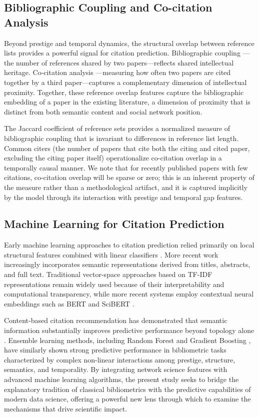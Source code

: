 \documentclass[11pt,a4paper]{article}
\begin{document}
\subsection{Bibliographic Coupling and Co-citation Analysis}

Beyond prestige and temporal dynamics, the structural overlap between reference lists provides a powerful signal for citation prediction. Bibliographic coupling \citep{kessler1963bibliographic}---the number of references shared by two papers---reflects shared intellectual heritage. Co-citation analysis \citep{small1973co}---measuring how often two papers are cited together by a third paper---captures a complementary dimension of intellectual proximity. Together, these reference overlap features capture the bibliographic embedding of a paper in the existing literature, a dimension of proximity that is distinct from both semantic content and social network position.

The Jaccard coefficient of reference sets provides a normalized measure of bibliographic coupling that is invariant to differences in reference list length. Common citers (the number of papers that cite both the citing and cited paper, excluding the citing paper itself) operationalize co-citation overlap in a temporally causal manner. We note that for recently published papers with few citations, co-citation overlap will be sparse or zero; this is an inherent property of the measure rather than a methodological artifact, and it is captured implicitly by the model through its interaction with prestige and temporal gap features.

\subsection{Machine Learning for Citation Prediction}

Early machine learning approaches to citation prediction relied primarily on local structural features combined with linear classifiers \citep{liben2007link}. More recent work increasingly incorporates semantic representations derived from titles, abstracts, and full text. Traditional vector-space approaches based on TF-IDF representations remain widely used because of their interpretability and computational transparency, while more recent systems employ contextual neural embeddings such as BERT and SciBERT \citep{devlin2019bert}.

Content-based citation recommendation has demonstrated that semantic information substantially improves predictive performance beyond topology alone \citep{bhagavatula2018content}. Ensemble learning methods, including Random Forest \citep{breiman2001random} and Gradient Boosting \citep{natekin2013gradient}, have similarly shown strong predictive performance in bibliometric tasks characterized by complex non-linear interactions among prestige, structure, semantics, and temporality. By integrating network science features with advanced machine learning algorithms, the present study seeks to bridge the explanatory tradition of classical bibliometrics with the predictive capabilities of modern data science, offering a powerful new lens through which to examine the mechanisms that drive scientific impact.
\end{document}
